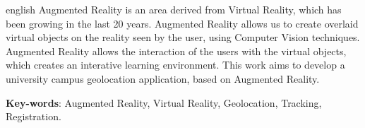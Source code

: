 \documentclass[12pt,openright,twoside,a4paper,english,french,spanish]{abntex2}
\begin{document}
\begin{resumo}[Abstract]
 \begin{otherlanguage*}{english}
    Augmented Reality is an area derived from Virtual Reality, which
    has been growing in the last 20 years. Augmented Reality allows us to create
    overlaid virtual objects on the reality seen by the user, using
    Computer Vision techniques. Augmented Reality allows the interaction of the users
    with the virtual objects, which creates an interative learning environment. 
    This work aims to develop a university campus geolocation application, based on Augmented Reality.
    



   \vspace{\onelineskip}
 
   \noindent 
   \textbf{Key-words}: Augmented Reality, Virtual Reality, Geolocation, Tracking, Registration.
 \end{otherlanguage*}
\end{resumo}







\listoffigures
\cleardoublepage

\listoftables
\cleardoublepage


\lstlistoflistings
\cleardoublepage


\glsaddall


\printglossaries
\cleardoublepage



\tableofcontents*
\cleardoublepage
\end{document}
